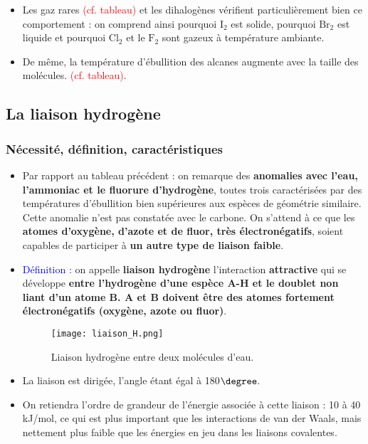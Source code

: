 \documentclass[11pt,a4paper]{report}
\begin{document}
\begin{itemize}
	
	
	
\item Les gaz rares \textcolor{red}{(cf. tableau)} et les dihalogènes vérifient particulièrement 	bien ce comportement : on comprend ainsi pourquoi $\text{I}_2$ est solide, pourquoi $\text{Br}_2$ est liquide et pourquoi	$\text{Cl}_2$ et le $\text{F}_2$ sont gazeux à température ambiante.\\

\item De même, la température d'ébullition des alcanes augmente avec la taille des molécules. \textcolor{red}{(cf. tableau)}.\\	
\end{itemize}

\subsection{La liaison hydrogène}

\subsubsection{Nécessité, définition, caractéristiques}
\begin{itemize}
	\item Par rapport au tableau précédent : on remarque des \textbf{anomalies avec l'eau, 					l'ammoniac et le fluorure d'hydrogène}, toutes trois caractérisées par des températures 				d'ébullition bien supérieures aux espèces de géométrie similaire. Cette anomalie n'est pas 				constatée avec le carbone. On s'attend à ce que les \textbf{atomes d'oxygène, d'azote et de 			fluor, très électronégatifs}, soient capables de participer à \textbf{un autre type de liaison 			faible}.\\
	
	\item \textcolor{blue}{Définition :} on appelle \textbf{liaison hydrogène} l'interaction 				\textbf{attractive} qui se développe \textbf{entre l'hydrogène d'une espèce A-H et le doublet 			non liant d'un atome B. A et B doivent être des atomes fortement électronégatifs (oxygène, azote 	ou fluor)}.\\
	
	\begin{figure}[h!]
	\begin{center}
		\texttt{[image: liaison\_H.png]}
	\end{center}
	\caption{Liaison hydrogène entre deux molécules d'eau.}
	\end{figure}

	\item La liaison est dirigée, l'angle étant égal à 180$\degree$.\\
	
	\item On retiendra l'ordre de grandeur de l'énergie associée à cette liaison : 10 à 40 kJ/mol, 			ce qui est plus important que les interactions de van der Waals, mais nettement plus faible que 		les énergies en jeu dans les liaisons covalentes.
\end{itemize}
\end{document}

